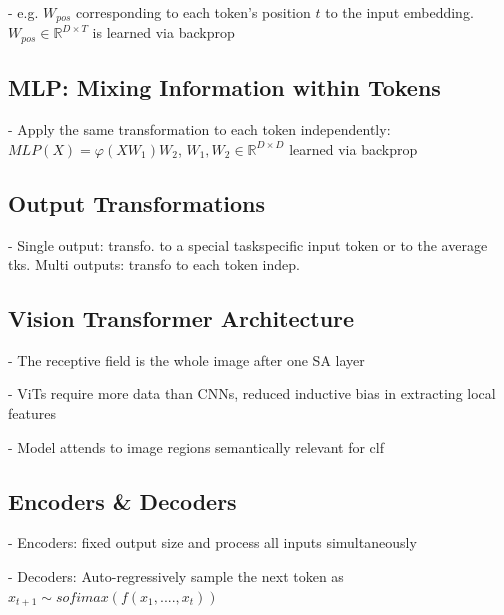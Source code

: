 - e.g. $W_{p o s}$ corresponding to each token's position $t$ to the input embedding. $W_{p o s}\in\mathbb{R}^{D\times T}$ is learned via backprop

\subsection*{MLP: Mixing Information within Tokens}
- Apply the same transformation to each token
independently: $M L P(X)=\varphi(X W_{1})W_{2}$,
$W_{1},W_{2}\in\mathbb{R}^{D\times D}$ learned via backprop

\subsection*{Output Transformations}


- Single output: transfo. to a special taskspecific input token or to the average tks. Multi outputs: transfo to each token indep.

\subsection*{Vision Transformer Architecture}


- The receptive field is the whole image after one SA layer

- ViTs require more data than CNNs, reduced inductive bias in extracting local features

- Model attends to image regions semantically relevant for clf

\subsection*{Encoders \& Decoders}


- Encoders: fixed output size and process all inputs simultaneously

- Decoders: Auto-regressively sample the next token as $x_{t+1}\sim s o f i m a x(f(x_{1},....,x_{t}))$

